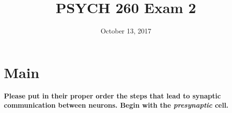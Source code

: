\documentclass[answers]{exam}
\title{PSYCH 260 Exam 2}
\author{}
\date{October 13, 2017}
\begin{document}
\maketitle

\begin{center}
\end{center}
\vspace{0.1in}

\newpage

\section{Main}

\textbf{Please put in their proper order the steps that lead to synaptic communication between neurons. Begin with the \emph{presynaptic} cell.}
\end{document}
